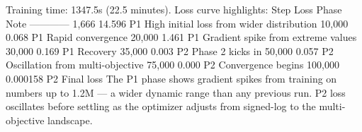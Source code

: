 {}\markdownRendererThematicBreak{}\markdownRendererInterblockSeparator
{}
\markdownRendererSectionEnd 
\markdownRendererSectionEnd \markdownRendererSectionBegin
{}\markdownRendererInterblockSeparator
{}\markdownRendererSectionBegin
{}\markdownRendererInterblockSeparator
{}Training time: 1347.5s (\markdownRendererTilde{}22.5 minutes).\markdownRendererParagraphSeparator
{}Loss curve highlights:\markdownRendererParagraphSeparator
{}\markdownRendererPipe{} Step \markdownRendererPipe{} Loss \markdownRendererPipe{} Phase \markdownRendererPipe{} Note \markdownRendererPipe{}\markdownRendererSoftLineBreak
{}\markdownRendererPipe{}---\markdownRendererPipe{}---\markdownRendererPipe{}---\markdownRendererPipe{}---\markdownRendererPipe{}\markdownRendererSoftLineBreak
{}\markdownRendererPipe{} 1,666 \markdownRendererPipe{} 14.596 \markdownRendererPipe{} P1 \markdownRendererPipe{} High initial loss from wider distribution \markdownRendererPipe{}\markdownRendererSoftLineBreak
{}\markdownRendererPipe{} 10,000 \markdownRendererPipe{} 0.068 \markdownRendererPipe{} P1 \markdownRendererPipe{} Rapid convergence \markdownRendererPipe{}\markdownRendererSoftLineBreak
{}\markdownRendererPipe{} 20,000 \markdownRendererPipe{} 1.461 \markdownRendererPipe{} P1 \markdownRendererPipe{} Gradient spike from extreme values \markdownRendererPipe{}\markdownRendererSoftLineBreak
{}\markdownRendererPipe{} 30,000 \markdownRendererPipe{} 0.169 \markdownRendererPipe{} P1 \markdownRendererPipe{} Recovery \markdownRendererPipe{}\markdownRendererSoftLineBreak
{}\markdownRendererPipe{} 35,000 \markdownRendererPipe{} 0.003 \markdownRendererPipe{} P2 \markdownRendererPipe{} Phase 2 kicks in \markdownRendererPipe{}\markdownRendererSoftLineBreak
{}\markdownRendererPipe{} 50,000 \markdownRendererPipe{} 0.057 \markdownRendererPipe{} P2 \markdownRendererPipe{} Oscillation from multi-objective \markdownRendererPipe{}\markdownRendererSoftLineBreak
{}\markdownRendererPipe{} 75,000 \markdownRendererPipe{} 0.000 \markdownRendererPipe{} P2 \markdownRendererPipe{} Convergence begins \markdownRendererPipe{}\markdownRendererSoftLineBreak
{}\markdownRendererPipe{} 100,000 \markdownRendererPipe{} 0.000158 \markdownRendererPipe{} P2 \markdownRendererPipe{} Final loss \markdownRendererPipe{}\markdownRendererParagraphSeparator
{}The P1 phase shows gradient spikes from training on numbers up to 1.2M — a wider dynamic range than any previous run. P2 loss oscillates before settling as the optimizer adjusts from signed-log to the multi-objective landscape.\markdownRendererInterblockSeparator
